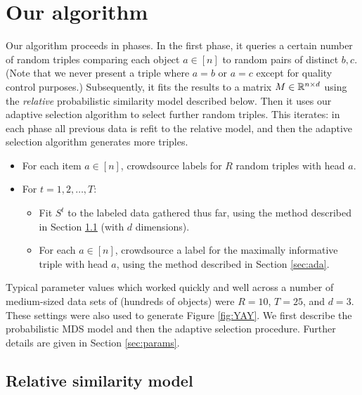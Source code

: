 \documentclass{article}
\begin{document}
\section{Our algorithm}

Our algorithm proceeds in phases.  In the first phase, it queries a certain number of random triples comparing each object $a \in [n]$ to random pairs of distinct $b,c$.  (Note that we never present a triple where $a=b$ or $a=c$ except for quality control purposes.) Subsequently, it fits the results to a matrix $M \in \mathbb{R}^{n \times d}$ using the {\em relative} probabilistic similarity model described below.  Then it uses our adaptive selection algorithm to select further random triples.  This iterates: in each phase all previous data is refit to the relative model, and then the adaptive selection algorithm generates more triples.  
\begin{itemize}
\item For each item $a\in [n]$, crowdsource labels for $R$ random triples with head $a$.
\item For $t=1,2,\ldots,T:$
\begin{itemize}
\item Fit $S^t$ to the labeled data gathered thus far, using the method described in Section \ref{sec:rel} (with $d$ dimensions).
\item For each $a\in [n]$, crowdsource a label for the maximally informative triple with head $a$, using the method described in Section \ref{sec:ada}.
\end{itemize}
\end{itemize}
Typical parameter values which worked quickly and well across a number of medium-sized data sets of (hundreds of objects) were $R=10$, $T=25$, and $d=3$.  These settings were also used to generate Figure \ref{fig:YAY}.  We first describe the probabilistic MDS model and then the adaptive selection procedure.  Further details are given in Section \ref{sec:params}.

\subsection{Relative similarity model}\label{sec:rel}
\end{document}
